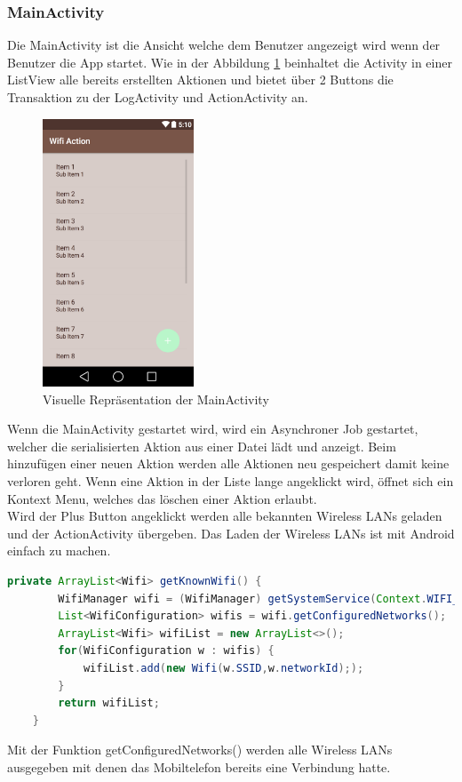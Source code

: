 \subsubsection{MainActivity}
Die MainActivity ist die Ansicht welche dem Benutzer angezeigt wird wenn der Benutzer die App startet. Wie in der Abbildung \ref{fig:mainactivity} beinhaltet die Activity in einer ListView alle bereits erstellten Aktionen und bietet über 2 Buttons die Transaktion zu der LogActivity und ActionActivity an.
\begin{figure}[ht]
	\centering
	\includegraphics[width=0.4\textwidth]{images/mainactivity.png}
	\caption{Visuelle Repräsentation der MainActivity}
	\label{fig:mainactivity}
\end{figure}
Wenn die MainActivity gestartet wird, wird ein Asynchroner Job gestartet, welcher die serialisierten Aktion aus einer Datei lädt und anzeigt. Beim hinzufügen einer neuen Aktion werden alle Aktionen neu gespeichert damit keine verloren geht. Wenn eine Aktion in der Liste lange angeklickt wird, öffnet sich ein Kontext Menu, welches das löschen einer Aktion erlaubt. \\
Wird der Plus Button angeklickt werden alle bekannten Wireless LANs geladen und der ActionActivity übergeben. Das Laden der Wireless LANs ist mit Android einfach zu machen. \\
\begin{lstlisting}[language=Java]
	private ArrayList<Wifi> getKnownWifi() {
        WifiManager wifi = (WifiManager) getSystemService(Context.WIFI_SERVICE);
        List<WifiConfiguration> wifis = wifi.getConfiguredNetworks();
        ArrayList<Wifi> wifiList = new ArrayList<>();
        for(WifiConfiguration w : wifis) {
            wifiList.add(new Wifi(w.SSID,w.networkId););
        }
        return wifiList;
    }
\end{lstlisting}
Mit der Funktion getConfiguredNetworks() werden alle Wireless LANs ausgegeben mit denen das Mobiltelefon bereits eine Verbindung hatte.

